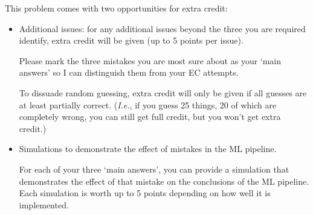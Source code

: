 \documentclass[10pt]{article}
\begin{document}
This problem comes with two opportunities for extra credit: 
\begin{itemize}
    \item Additional issues: for any additional issues beyond the three you are required identify, extra credit will be given (up to 5 points per issue). 

    Please mark the three mistakes you are most sure about as your `main answers' so I can distinguish them from your EC attempts.

    To dissuade random guessing, extra credit will only be given if all guesses are at least partially correct. (\emph{I.e.}, if you guess 25 things, 20 of which are completely wrong, you can still get full credit, but you won't get extra credit.)
    \item Simulations to demonstrate the effect of mistakes in the ML pipeline. 

    For each of your three `main answers', you can provide a simulation that demonstrates the effect of that mistake on the conclusions of the ML pipeline. Each simulation is worth up to 5 points depending on how well it is implemented.
\end{itemize}
\end{document}
